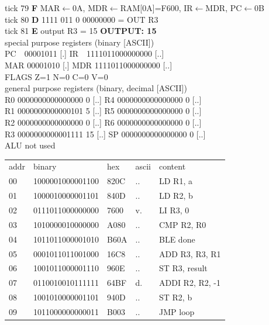 \noindent\begin{tcolorbox}[stepbox, title={Instruction 27 \hfill ticks 79 to 81 \quad OUT R3}]
\textcolor{dim}{tick 79} \textbf{F} MAR$\leftarrow$0A, MDR$\leftarrow$RAM[0A]=F600, IR$\leftarrow$MDR, PC$\leftarrow$0B\\
\textcolor{dim}{tick 80} \textbf{D} 1111 011 0 00000000 = OUT R3\\
\textcolor{dim}{tick 81} \textbf{E} output R3 = 15 \hfill \colorbox{outc}{\textbf{OUTPUT: 15}}\\[2pt]
\textcolor{dim}{special purpose registers (binary [ASCII])}\\
PC~~00001011 [.] \hfill IR~~1111011000000000 [..]\\
MAR 00001010 [.] \hfill MDR 1111011000000000 [..]\\
FLAGS Z=1 N=0 C=0 V=0\\[2pt]
\textcolor{dim}{general purpose registers (binary, decimal [ASCII])}\\
R0 0000000000000000 0 [..] \hfill R4 0000000000000000 0 [..]\\
R1 0000000000000101 5 [..] \hfill R5 0000000000000000 0 [..]\\
R2 0000000000000000 0 [..] \hfill R6 0000000000000000 0 [..]\\
R3 0000000000001111 15 [..] \hfill SP 0000000000000000 0 [..]\\
\textcolor{dim}{ALU not used}\\[2pt]
{\setlength{\tabcolsep}{2pt}\begin{tabular}{@{}lllll@{}}
\textcolor{dim}{addr} & \textcolor{dim}{binary} & \textcolor{dim}{hex} & \textcolor{dim}{ascii} & \textcolor{dim}{content}\\
00 & 1000001000001100 & 820C & .. & LD R1, a\\
01 & 1000010000001101 & 840D & .. & LD R2, b\\
02 & 0111011000000000 & 7600 & v. & LI R3, 0\\
03 & 1010000010000000 & A080 & .. & CMP R2, R0\\
04 & 1011011000001010 & B60A & .. & BLE done\\
05 & 0001011011001000 & 16C8 & .. & ADD R3, R3, R1\\
06 & 1001011000001110 & 960E & .. & ST R3, result\\
07 & 0110010010111111 & 64BF & d. & ADDI R2, R2, -1\\
08 & 1001010000001101 & 940D & .. & ST R2, b\\
09 & 1011000000000011 & B003 & .. & JMP loop\\

\end{tabular}}
\end{tcolorbox}
